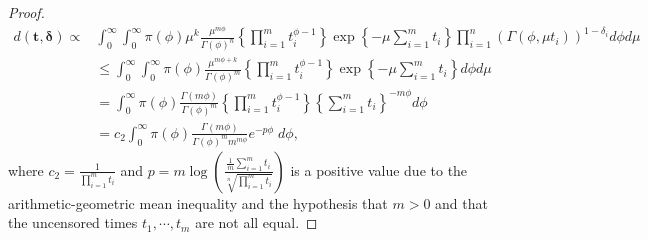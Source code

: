 \documentclass[]{interact}
\theoremstyle{plain}%
\theoremstyle{definition}
\theoremstyle{remark}
\begin{document}
\begin{appendix}
\begin{proof}

\begin{align*}
d(\boldsymbol{t,\delta})\propto &\int_{0}^{\infty}\int_{0}^{\infty}\pi(\phi)\mu^k\frac{\mu^{m\phi}}{\Gamma(\phi)^n}\left\{\prod_{i=1}^m{t_i^{\phi-1}}\right\}\exp\left\{-\mu\sum_{i=1}^m t_i\right\}\prod_{i=1}^n\left(\Gamma(\phi,\mu t_i)\right)^{1-\delta_i}d\phi d\mu \nonumber\\
&\leq \int_{0}^{\infty}\int_{0}^{\infty}\pi(\phi)\frac{\mu^{m\phi+k}}{\Gamma(\phi)^m}\left\{\prod_{i=1}^m{t_i^{\phi-1}}\right\}\exp\left\{-\mu\sum_{i=1}^m t_i\right\}d\phi d\mu \nonumber\\
&= \int_{0}^{\infty}\pi(\phi)\frac{\Gamma(m\phi)}{\Gamma(\phi)^m}\left\{\prod_{i=1}^m{t_i^{\phi-1}}\right\}\left\{\sum_{i=1}^m t_i\right\}^{-m\phi} d\phi \nonumber \\
&= c_2\int_{0}^{\infty}\pi(\phi)\frac{\Gamma(m\phi)}{\Gamma(\phi)^m m^{m \phi}}e^{-p\phi}\; d\phi,
\end{align*}
where $c_2 = \frac{1}{\prod_{i=1}^m t_i}$ 
and $p = m \log\left(\frac{\frac{1}{m}\sum_{i=1}^m t_i}{\sqrt[n]{\prod_{i=1}^m t_i}}\right)$ is a positive value due to the arithmetic-geometric mean inequality and the hypothesis that $m>0$ and that the uncensored times $t_1,\cdots,t_m$ are not all equal.


\end{proof}
\end{appendix}
\end{document}
